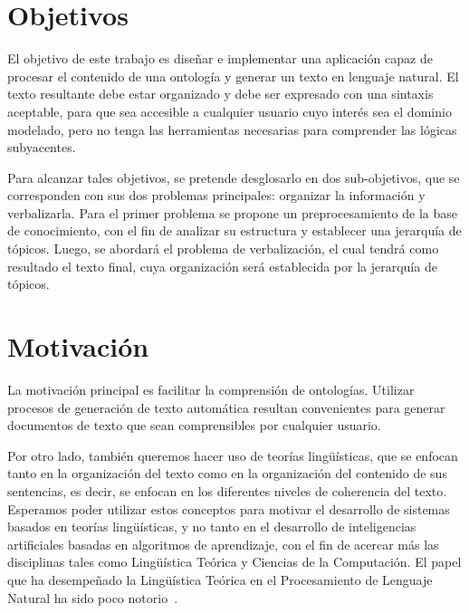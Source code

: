 \documentclass[11pt,a4paper,spanish]{book}
\begin{document}
\section{Objetivos}\label{Intro:objetivo}
El objetivo de este trabajo es diseñar e implementar una aplicación capaz de procesar el contenido de una ontología y generar un texto en lenguaje natural. El texto resultante debe estar organizado y debe ser expresado con una sintaxis aceptable, para que sea accesible a cualquier usuario cuyo interés sea el dominio modelado, pero no tenga las herramientas necesarias para comprender las lógicas subyacentes.

Para alcanzar tales objetivos, se pretende desglosarlo en dos sub-objetivos, que se corresponden con sus dos problemas principales: organizar la información y verbalizarla. Para el primer problema se propone un preprocesamiento de la base de conocimiento, con el fin de analizar su estructura y establecer una jerarquía de tópicos. Luego, se abordará el problema de verbalización, el cual tendrá como resultado el texto final, cuya organización será establecida por la jerarquía de tópicos.

\section{Motivación}
La motivación principal es facilitar la comprensión de ontologías. Utilizar procesos de generación de texto automática resultan convenientes para generar documentos de texto que sean comprensibles por cualquier usuario.

Por otro lado, también queremos hacer uso de teorías lingüísticas, que se enfocan tanto en la organización del texto como en la organización del contenido de sus sentencias, es decir, se enfocan en los diferentes niveles de coherencia del texto. Esperamos poder utilizar estos conceptos para motivar el desarrollo de sistemas basados en teorías lingüísticas, y no tanto en el desarrollo de inteligencias artificiales basadas en algoritmos de aprendizaje, con el fin de acercar más las disciplinas tales como Lingüística Teórica y Ciencias de la Computación. El papel que ha desempeñado la Lingüística Teórica en el Procesamiento de Lenguaje Natural ha sido poco notorio~\cite{perinan2012defensa}.
















\end{document}

